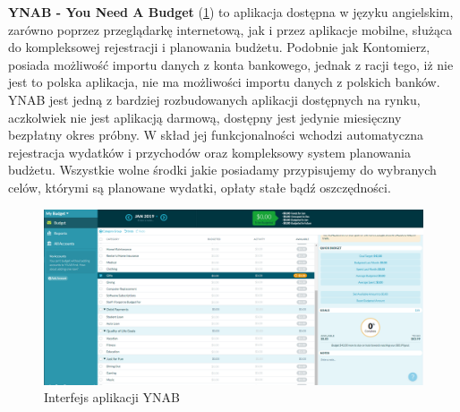 \textbf{YNAB - You Need A Budget} (\ref{ynab_interfejs}) to aplikacja dostępna w języku angielskim, zarówno poprzez przeglądarkę internetową, jak i przez aplikacje mobilne, służąca do kompleksowej rejestracji i planowania budżetu. Podobnie jak Kontomierz, posiada możliwość importu danych z konta bankowego, jednak z racji tego, iż nie jest to polska aplikacja, nie ma możliwości importu danych z polskich banków.\\
YNAB jest jedną z bardziej rozbudowanych aplikacji dostępnych na rynku, aczkolwiek nie jest aplikacją darmową,  dostępny jest jedynie miesięczny bezpłatny okres próbny. W skład jej funkcjonalności wchodzi automatyczna rejestracja wydatków i przychodów oraz kompleksowy system planowania budżetu. Wszystkie wolne środki jakie posiadamy przypisujemy do wybranych celów, którymi są planowane wydatki, opłaty stałe bądź oszczędności.
\begin{figure}[h!]
	\begin{center}
		\includegraphics[width=6in]{img/aplikacje/ynab_interfejs.png}
		\caption{Interfejs aplikacji YNAB}
		\label{ynab_interfejs}
	\end{center}
\end{figure}

